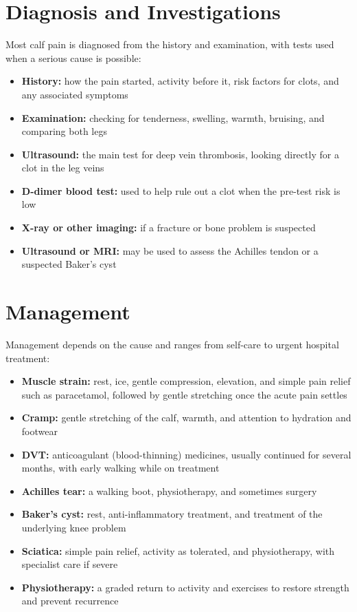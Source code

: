 \section*{Diagnosis and Investigations}
Most calf pain is diagnosed from the history and examination, with tests used when a serious cause is possible:
\begin{itemize}
    \item \textbf{History:} how the pain started, activity before it, risk factors for clots, and any associated symptoms
    \item \textbf{Examination:} checking for tenderness, swelling, warmth, bruising, and comparing both legs
    \item \textbf{Ultrasound:} the main test for deep vein thrombosis, looking directly for a clot in the leg veins
    \item \textbf{D-dimer blood test:} used to help rule out a clot when the pre-test risk is low
    \item \textbf{X-ray or other imaging:} if a fracture or bone problem is suspected
    \item \textbf{Ultrasound or MRI:} may be used to assess the Achilles tendon or a suspected Baker's cyst
\end{itemize}

\section*{Management}
Management depends on the cause and ranges from self-care to urgent hospital treatment:
\begin{itemize}
    \item \textbf{Muscle strain:} rest, ice, gentle compression, elevation, and simple pain relief such as paracetamol, followed by gentle stretching once the acute pain settles
    \item \textbf{Cramp:} gentle stretching of the calf, warmth, and attention to hydration and footwear
    \item \textbf{DVT:} anticoagulant (blood-thinning) medicines, usually continued for several months, with early walking while on treatment
    \item \textbf{Achilles tear:} a walking boot, physiotherapy, and sometimes surgery
    \item \textbf{Baker's cyst:} rest, anti-inflammatory treatment, and treatment of the underlying knee problem
    \item \textbf{Sciatica:} simple pain relief, activity as tolerated, and physiotherapy, with specialist care if severe
    \item \textbf{Physiotherapy:} a graded return to activity and exercises to restore strength and prevent recurrence
\end{itemize}

